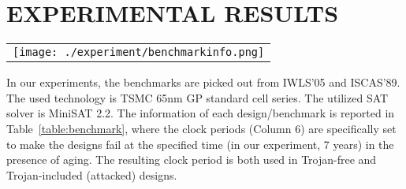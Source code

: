 \section{EXPERIMENTAL RESULTS}
\label{sec:mot}

\begin{table*}
\centering
\caption{Benchmark information and average probabilities of Monte-Carlo instances}
	\begin{tabular}{l}
	\texttt{[image: ./experiment/benchmarkinfo.png]}
	\end{tabular}
\label{table:benchmark}
\end{table*}

\begin{figure*}[!ht]
    \centering
    \caption{Lifetime distributions of Monte-Carlo Instances of Trojan-included \textit{s38417} and \textit{des\_perf}}
    \label{fig:exp}
\end{figure*}

In our experiments, the benchmarks are picked out from IWLS'05 and ISCAS'89. The used technology is TSMC 65nm GP standard cell series. The utilized SAT solver is MiniSAT 2.2. The information of each design/benchmark is reported in Table~\ref{table:benchmark}, where the clock periods (Column 6) are specifically set to make the designs fail at the specified time (in our experiment, 7 years) in the presence of aging. The resulting clock period is both used in Trojan-free and Trojan-included (attacked) designs. 

